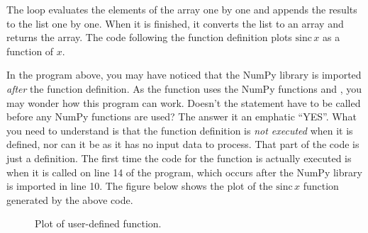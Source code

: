 \documentclass[letterpaper,10pt,english]{sphinxmanual}
\begin{document}
The  loop evaluates the elements of the  array one by one and appends the results to the list  one by one.  When it is finished, it converts the list to an array and returns the array.  The code following the function definition plots \(\mathrm{sinc}\,x\) as a function of \(x\).

In the program above, you may have noticed that the NumPy library is imported \emph{after} the  function definition.  As the function uses the NumPy functions  and , you may wonder how this program can work.  Doesn't the  statement have to be called before any NumPy functions are used?  The answer it an emphatic ``YES''.  What you need to understand is that the function definition is \emph{not executed} when it is defined, nor can it be as it has no input  data to process.  That part of the code is just a definition.  The first time the code for the  function is actually executed is when it is called on line 14 of the program, which occurs after the NumPy library is imported in line 10.  The figure below shows the plot of the \(\mathrm{sinc}\,x\) function generated by the above code.
\begin{figure}[htbp]
\centering
\capstart

\caption{Plot of user-defined  function.}\end{figure}

\end{document}
